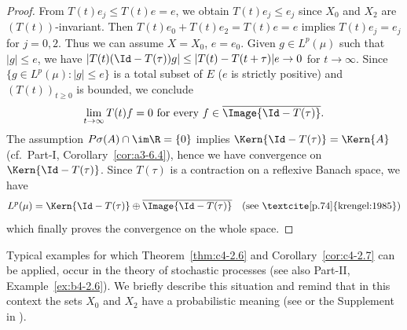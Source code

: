 \begin{proof}
From $T(t)e_{j} \leq T(t)e = e$, we obtain $T(t)e_{j} \leq e_{j}$ since $X_{0}$ and $X_{2}$ are $(T(t))$-invariant.
Then $T(t)e_{0} + T(t)e_{2} = T(t)e = e$ implies $T(t)e_{j} = e_{j}$ for $j=0,2$.
Thus we can assume $X = X_{0}$, $e = e_{0}$.
Given $g \in L^{p}(\mu)$ such that $|g| \leq e$, we have
$|T(t)(\Id - T(\tau))g| \leq |T(t) - T(t+\tau)|e \to 0$ for $t \to \infty$.
Since $\{g \in L^{p}(\mu) \colon |g| \leq e\}$ is a total subset of\/ $E$ ($e$ is strictly positive) and $(T(t))_{t \geq 0}$ is bounded, we conclude
\begin{equation}\label{eq:c4-2.6}
\lim_{t \to \infty} T(t)f = 0 \text{ for every } f \in \overline{\Image{\Id - T(\tau)}}.
\end{equation}
The assumption $P{\sigma}(A) \cap \im\R = \{0\}$ implies $\Kern{\Id - T(\tau)} = \Kern{A}$ (cf.\ 
Part-I, Corollary~\ref{cor:a3-6.4}), hence we have convergence on $\Kern{\Id -T(\tau)}$.
Since $T(\tau)$ is a contraction on a reflexive Banach space, we have
\[
L^{p}(\mu) = \Kern{\Id - T(\tau)} \oplus \overline{\Image{\Id - T(\tau)}} \quad \text{(see \textcite [p.74]{krengel:1985})}
\]  
which finally proves the convergence on the whole space.
\end{proof}
Typical examples for which Theorem~\ref{thm:c4-2.6} and Corollary~\ref{cor:c4-2.7}  can be applied, occur in the theory of stochastic processes (see also Part-II, Example~\ref{ex:b4-2.6}).
We briefly describe this situation and remind that in this context the sets $X_{0}$ and $X_{2}$ have a probabilistic meaning (see \textcite{greinernagel:1982} or the Supplement in \textcite{krengel:1985}).
